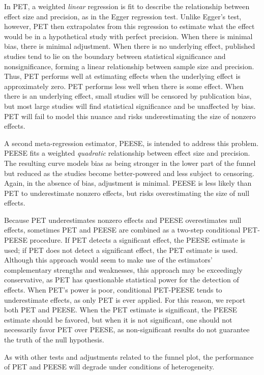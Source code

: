 \documentclass[man, mask]{apa6}
\begin{document}
In PET, a weighted {\em linear} regression is fit to describe the relationship between effect size and precision, as in the Egger regression test. Unlike Egger's test, however, PET then extrapolates from this regression to estimate what the effect would be in a hypothetical study with perfect precision. When there is minimal bias, there is minimal adjustment. When there is no underlying effect, published studies tend to lie on the boundary between statistical significance and nonsignificance, forming a linear relationship between sample size and precision. Thus, PET performs well at estimating effects when the underlying effect is approximately zero. PET performs less well when there is some effect. When there is an underlying effect, small studies will be censored by publication bias, but most large studies will find statistical significance and be unaffected by bias. PET will fail to model this nuance and risks underestimating the size of nonzero effects.

A second meta-regression estimator, PEESE, is intended to address this problem. PEESE fits a weighted {\em quadratic} relationship between effect size and precision. The resulting curve models bias as being stronger in the lower part of the funnel but reduced as the studies become better-powered and less subject to censoring. Again, in the absence of bias, adjustment is minimal. PEESE is less likely than PET to underestimate nonzero effects, but risks overestimating the size of null effects.

Because PET underestimates nonzero effects and PEESE overestimates null effects, sometimes PET and PEESE are combined as a two-step conditional PET-PEESE procedure. If PET detects a significant effect, the PEESE estimate is used; if PET does not detect a significant effect, the PET estimate is used. Although this approach would seem to make use of the estimators' complementary strengths and weaknesses, this approach may be exceedingly conservative, as PET has questionable statistical power for the detection of effects. When PET's power is poor, conditional PET-PEESE tends to underestimate effects, as only PET is ever applied. For this reason, we report both PET and PEESE. When the PET estimate is significant, the PEESE estimate should be favored, but when it is not significant, one should not necessarily favor PET over PEESE, as non-significant results do not guarantee the truth of the null hypothesis.

As with other tests and adjustments related to the funnel plot, the performance of PET and PEESE will degrade under conditions of heterogeneity.
\end{document}
